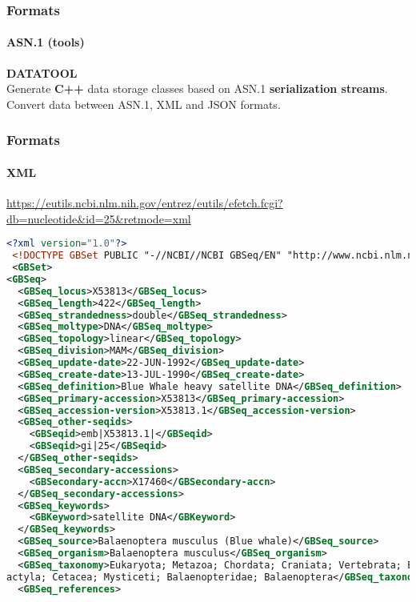 \documentclass{beamer}
\begin{document}
\begin{frame}[fragile]
\frametitle{Formats}
\framesubtitle{ASN.1 (tools)}
\begin{center}
{\bf DATATOOL}\\
Generate {\bf C++ }data storage classes based on ASN.1
{\bf serialization streams}.\\
Convert data between ASN.1, XML and JSON formats.\\
\end{center}
\end{frame}

\begin{frame}[fragile]
\frametitle{Formats}
\framesubtitle{XML}
\url{https://eutils.ncbi.nlm.nih.gov/entrez/eutils/efetch.fcgi?db=nucleotide&id=25&retmode=xml}
\begin{lstlisting}[language=xml,basicstyle=\tiny,breaklines=false]
<?xml version="1.0"?>
 <!DOCTYPE GBSet PUBLIC "-//NCBI//NCBI GBSeq/EN" "http://www.ncbi.nlm.nih.gov/dtd/NCBI_GBSeq.dtd">
 <GBSet>
<GBSeq>
  <GBSeq_locus>X53813</GBSeq_locus>
  <GBSeq_length>422</GBSeq_length>
  <GBSeq_strandedness>double</GBSeq_strandedness>
  <GBSeq_moltype>DNA</GBSeq_moltype>
  <GBSeq_topology>linear</GBSeq_topology>
  <GBSeq_division>MAM</GBSeq_division>
  <GBSeq_update-date>22-JUN-1992</GBSeq_update-date>
  <GBSeq_create-date>13-JUL-1990</GBSeq_create-date>
  <GBSeq_definition>Blue Whale heavy satellite DNA</GBSeq_definition>
  <GBSeq_primary-accession>X53813</GBSeq_primary-accession>
  <GBSeq_accession-version>X53813.1</GBSeq_accession-version>
  <GBSeq_other-seqids>
    <GBSeqid>emb|X53813.1|</GBSeqid>
    <GBSeqid>gi|25</GBSeqid>
  </GBSeq_other-seqids>
  <GBSeq_secondary-accessions>
    <GBSecondary-accn>X17460</GBSecondary-accn>
  </GBSeq_secondary-accessions>
  <GBSeq_keywords>
    <GBKeyword>satellite DNA</GBKeyword>
  </GBSeq_keywords>
  <GBSeq_source>Balaenoptera musculus (Blue whale)</GBSeq_source>
  <GBSeq_organism>Balaenoptera musculus</GBSeq_organism>
  <GBSeq_taxonomy>Eukaryota; Metazoa; Chordata; Craniata; Vertebrata; Euteleostomi; Mammalia; Eutheria; Laurasiatheria; Cetartiod
actyla; Cetacea; Mysticeti; Balaenopteridae; Balaenoptera</GBSeq_taxonomy>
  <GBSeq_references>
\end{lstlisting}
\end{frame}
\end{document}
